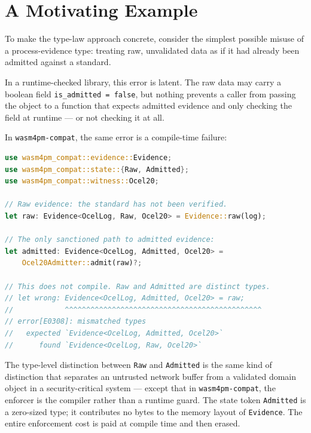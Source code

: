 \section{A Motivating Example}
\label{sec:intro-example}

To make the type-law approach concrete, consider the simplest possible misuse
of a process-evidence type: treating raw, unvalidated data as if it had already
been admitted against a standard.

In a runtime-checked library, this error is latent. The raw data may carry a
boolean field \texttt{is\_admitted = false}, but nothing prevents a caller from
passing the object to a function that expects admitted evidence and only
checking the field at runtime --- or not checking it at all.

In \texttt{wasm4pm-compat}, the same error is a compile-time failure:

\begin{lstlisting}[language=Rust, caption={Type-level lifecycle enforcement.
  \texttt{Evidence<T, Raw, W>} and \texttt{Evidence<T, Admitted, W>} are
  distinct types. The compiler rejects any attempt to use one as the other.},
  label={lst:intro-lifecycle}]
use wasm4pm_compat::evidence::Evidence;
use wasm4pm_compat::state::{Raw, Admitted};
use wasm4pm_compat::witness::Ocel20;

// Raw evidence: the standard has not been verified.
let raw: Evidence<OcelLog, Raw, Ocel20> = Evidence::raw(log);

// The only sanctioned path to admitted evidence:
let admitted: Evidence<OcelLog, Admitted, Ocel20> =
    Ocel20Admitter::admit(raw)?;

// This does not compile. Raw and Admitted are distinct types.
// let wrong: Evidence<OcelLog, Admitted, Ocel20> = raw;
//            ^^^^^^^^^^^^^^^^^^^^^^^^^^^^^^^^^^^^^^^^^^^^^^
// error[E0308]: mismatched types
//   expected `Evidence<OcelLog, Admitted, Ocel20>`
//      found `Evidence<OcelLog, Raw, Ocel20>`
\end{lstlisting}

The type-level distinction between \texttt{Raw} and \texttt{Admitted} is the
same kind of distinction that separates an untrusted network buffer from a
validated domain object in a security-critical system --- except that in
\texttt{wasm4pm-compat}, the enforcer is the compiler rather than a runtime
guard. The state token \texttt{Admitted} is a zero-sized type; it contributes
no bytes to the memory layout of \texttt{Evidence}. The entire enforcement cost
is paid at compile time and then erased.

